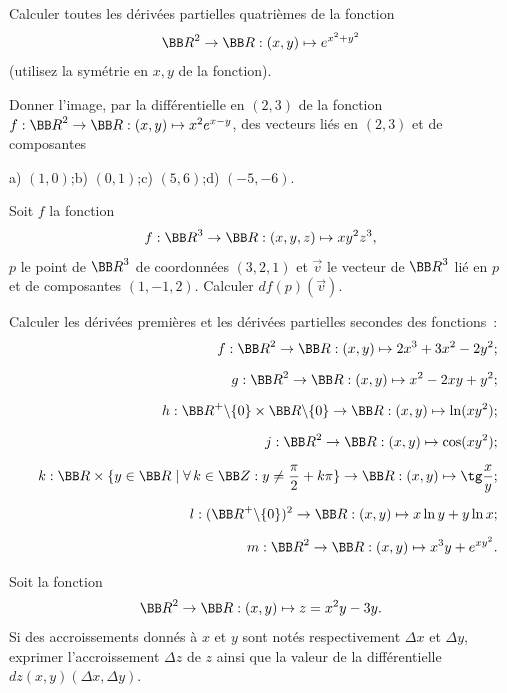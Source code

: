 \documentclass[12pt,french,oneside,a4paper]{memoir} %
\begin{document}
\begin{exo}
Calculer toutes les dérivées partielles quatrièmes de la
fonction
\begin{equation*}
{\BB R}^2\rightarrow\BB R :
(x,y)\mapsto \displaystyle{e^{x^2+y^2}}
\end{equation*}
(utilisez la symétrie en $x, y$ de la fonction).
\end{exo}
\begin{exo}
Donner l'image, par la différentielle en $(2,3)$ de la
fonction $f: {\BB R}^2\rightarrow\BB R :
(x,y)\mapsto x^2e^{x-y}$, des vecteurs liés en $(2,3)$ et de
composantes

\hspace*{5mm}a) $(1,0)$;\qquad b) $(0,1)$;\qquad c) $(5,6)$;\qquad d) $(-5,-6)$.
\end{exo}
\begin{exo}
Soit $f$ la fonction
$$
f: {\BB R}^3\rightarrow\BB R :
(x,y,z)\mapsto xy^2z^3,
$$
$p$ le point de ${\BB R}^3$ de coordonnées $(3,2,1)$ et $\vec v$
le vecteur de ${\BB R}^3$ lié en $p$ et de composantes
$(1,-1,2)$. Calculer $df(p)(\vec v)$.
\end{exo}

\begin{exo}
Calculer les dérivées premières %
et les dérivées partielles secondes des fonctions~:
\vspace{-4mm}
\begin{eqnarray*}
&& f: {\BB R}^2\rightarrow\BB R :
(x,y)\mapsto 2x^3+3x^2-2y^2;\\[2mm]
&& g: {\BB R}^2\rightarrow\BB R :
(x,y)\mapsto x^2-2xy+y^2;\\[2mm]
&& h:{\BB R}^+\backslash\{0\}\times\BB R\backslash\{0\}
\rightarrow\BB R : (x,y)\mapsto \ln(xy^2);\\[2mm]
&& j: {\BB R}^2\rightarrow\BB R :
(x,y)\mapsto\cos(xy^2);\\[2mm]
&& k: {\BB R}\times\{y\in\BB R\mid\forall\,k\in\BB
Z:y\neq\frac{\pi}{2}+k\pi\}\rightarrow\BB R : (x,y)\mapsto
\tg\frac{x}{y};\\[2mm]
&& l: ({\BB R}^+\backslash\{0\})^2\rightarrow\BB R :
(x,y)\mapsto x\ln y+y\ln x;\\[2mm]
&& m: {\BB R}^2\rightarrow\BB R :(x,y)\mapsto x^3y+e^{xy^2}.
\end{eqnarray*}
\end{exo}

\begin{exo}
Soit la fonction
\begin{equation*}
{\BB R}^2\rightarrow\BB R :
(x,y)\mapsto z=x^2y-3y.
\end{equation*}
Si des accroissements donnés à $x$ et $y$ sont notés
respectivement $\Delta x$ et $\Delta y$, exprimer l'accroissement
$\Delta z$ de $z$ ainsi que la valeur de la différentielle
$dz(x,y)(\Delta x,\Delta y)$.
\end{exo}
\end{document}
